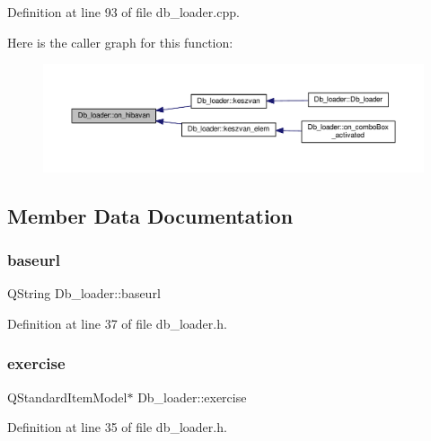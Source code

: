Definition at line 93 of file db\+\_\+loader.\+cpp.

Here is the caller graph for this function\+:\nopagebreak
\begin{figure}[H]
\begin{center}
\leavevmode
\includegraphics[width=350pt]{classDb__loader_aebf68b20ad5c3c7bac822b7c41f4e4ff_icgraph}
\end{center}
\end{figure}


\subsection{Member Data Documentation}
\mbox{\label{classDb__loader_a2f830277361852656d3883ed25a9637d}} 
\subsubsection{\texorpdfstring{baseurl}{baseurl}}
{\footnotesize\ttfamily Q\+String Db\+\_\+loader\+::baseurl\hspace{0.3cm}{\ttfamily [private]}}



Definition at line 37 of file db\+\_\+loader.\+h.

\mbox{\label{classDb__loader_ae2bf960f9be242be7b72496bd28fb2b3}} 
\subsubsection{\texorpdfstring{exercise}{exercise}}
{\footnotesize\ttfamily Q\+Standard\+Item\+Model$\ast$ Db\+\_\+loader\+::exercise\hspace{0.3cm}{\ttfamily [private]}}



Definition at line 35 of file db\+\_\+loader.\+h.


